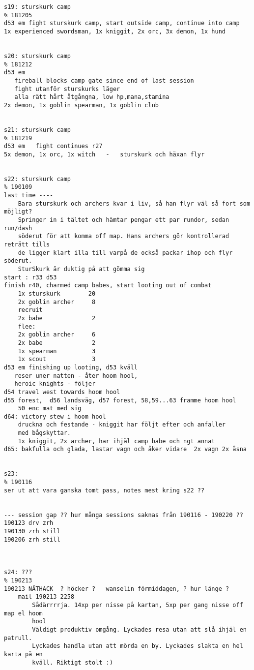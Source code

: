 \begin{verbatim}
s19: sturskurk camp                                                     % 181205
d53 em fight sturskurk camp, start outside camp, continue into camp
1x experienced swordsman, 1x kniggit, 2x orc, 3x demon, 1x hund


s20: sturskurk camp                                                     % 181212
d53 em
   fireball blocks camp gate since end of last session
   fight utanför sturskurks läger
   alla rätt hårt åtgångna, low hp,mana,stamina
2x demon, 1x goblin spearman, 1x goblin club


s21: sturskurk camp                                                     % 181219
d53 em   fight continues r27
5x demon, 1x orc, 1x witch   -   sturskurk och häxan flyr


s22: sturskurk camp                                                     % 190109
last time ----
    Bara sturskurk och archers kvar i liv, så han flyr väl så fort som möjligt?
    Springer in i tältet och hämtar pengar ett par rundor, sedan run/dash 
    söderut för att komma off map. Hans archers gör kontrollerad reträtt tills 
    de ligger klart illa till varpå de också packar ihop och flyr söderut.
    SturSkurk är duktig på att gömma sig
start : r33 d53
finish r40, charmed camp babes, start looting out of combat
    1x sturskurk        20
    2x goblin archer     8
    recruit
    2x babe              2
    flee:
    2x goblin archer     6
    2x babe              2
    1x spearman          3
    1x scout             3
d53 em finishing up looting, d53 kväll
   reser uner natten - åter hoom hool,
   heroic knights - följer
d54 travel west towards hoom hool
d55 forest,  d56 landsväg, d57 forest, 58,59...63 framme hoom hool
    50 enc mat med sig
d64: victory stew i hoom hool
    druckna och festande - kniggit har följt efter och anfaller
    med bågskyttar. 
    1x kniggit, 2x archer, har ihjäl camp babe och ngt annat
d65: bakfulla och glada, lastar vagn och åker vidare  2x vagn 2x åsna


s23:                                                                    % 190116
ser ut att vara ganska tomt pass, notes mest kring s22 ??


--- session gap ?? hur många sessions saknas från 190116 - 190220 ??
190123 drv zrh
190130 zrh still
190206 zrh still



s24: ???                                                                % 190213
190213 NÄTHACK  ? höcker ?   wanselin förmiddagen, ? hur länge ?
    mail 190213 2258
        Sådärrrrja. 14xp per nisse på kartan, 5xp per gang nisse off map el hoom
        hool
        Väldigt produktiv omgång. Lyckades resa utan att slå ihjäl en patrull.
        Lyckades handla utan att mörda en by. Lyckades slakta en hel karta på en
        kväll. Riktigt stolt :)


\end{verbatim}
